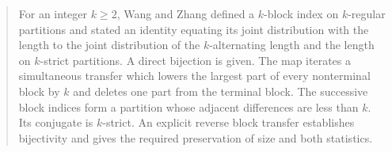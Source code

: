 \documentclass[11pt,reqno]{amsart}
\numberwithin{equation}{section}
\theoremstyle{definition}
\theoremstyle{remark}
\begin{document}
\begin{abstract}
For an integer $k\geq2$, Wang and Zhang defined a $k$-block index on
$k$-regular partitions and stated an identity equating its joint distribution
with the length to the joint distribution of the $k$-alternating length and
the length on $k$-strict partitions. A direct bijection is given. The map
iterates a simultaneous transfer which lowers the largest part of every
nonterminal block by $k$ and deletes one part from the terminal block. The
successive block indices form a partition whose adjacent differences are less
than $k$. Its conjugate is $k$-strict. An explicit reverse block transfer
establishes bijectivity and gives the required preservation of size and both
statistics.
\end{abstract}

\maketitle









\end{document}
